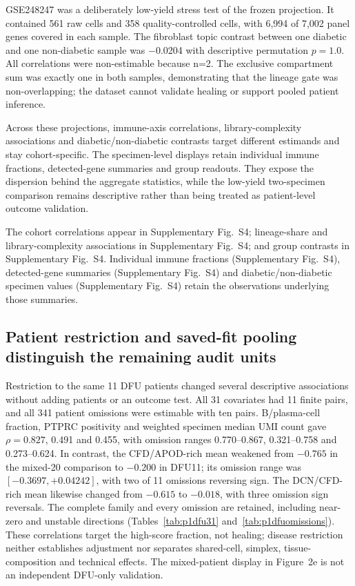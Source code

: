 \documentclass[10pt,a4paper]{article}
\begin{document}
GSE248247 was a deliberately low-yield stress test of the frozen projection. It contained 561 raw cells and 358 quality-controlled cells, with 6,994 of 7,002 panel genes covered in each sample. The fibroblast topic contrast between one diabetic and one non-diabetic sample was −0.0204 with descriptive permutation $p=1.0$. All correlations were non-estimable because n=2. The exclusive compartment sum was exactly one in both samples, demonstrating that the lineage gate was non-overlapping; the dataset cannot validate healing or support pooled patient inference.

Across these projections, immune-axis correlations, library-complexity associations and diabetic/non-diabetic contrasts target different estimands and stay cohort-specific. The specimen-level displays retain individual immune fractions, detected-gene summaries and group readouts. They expose the dispersion behind the aggregate statistics, while the low-yield two-specimen comparison remains descriptive rather than being treated as patient-level outcome validation.

The cohort correlations appear in Supplementary Fig.~S4\label{call:p1f9}; lineage-share and library-complexity associations in Supplementary Fig.~S4; and group contrasts in Supplementary Fig.~S4. Individual immune fractions (Supplementary Fig.~S4), detected-gene summaries (Supplementary Fig.~S4) and diabetic/non-diabetic specimen values (Supplementary Fig.~S4) retain the observations underlying those summaries.




\subsection{Patient restriction and saved-fit pooling distinguish the remaining audit units}

Restriction to the same 11 DFU patients changed several descriptive associations without adding patients or an outcome test. All 31 covariates had 11 finite pairs, and all 341 patient omissions were estimable with ten pairs. B/plasma-cell fraction, PTPRC positivity and weighted specimen median UMI count gave $\rho=0.827$, 0.491 and 0.455, with omission ranges 0.770--0.867, 0.321--0.758 and 0.273--0.624. In contrast, the CFD/APOD-rich mean weakened from $-0.765$ in the mixed-20 comparison to $-0.200$ in DFU11; its omission range was $[-0.3697,+0.04242]$, with two of 11 omissions reversing sign. The DCN/CFD-rich mean likewise changed from $-0.615$ to $-0.018$, with three omission sign reversals. The complete family and every omission are retained, including near-zero and unstable directions (Tables~\ref{tab:p1dfu31} and~\ref{tab:p1dfuomissions}). These correlations target the high-score fraction, not healing; disease restriction neither establishes adjustment nor separates shared-cell, simplex, tissue-composition and technical effects. The mixed-patient display in Figure~2e is not an independent DFU-only validation.
\end{document}
